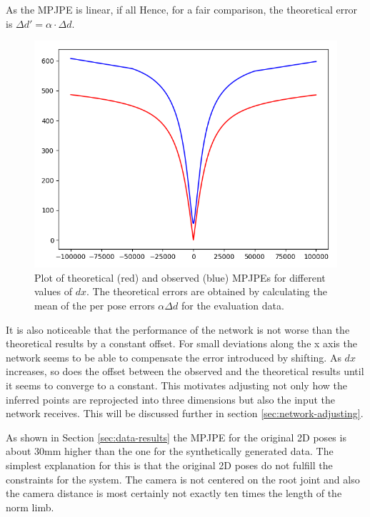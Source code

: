 As the MPJPE is linear, if all 
Hence, for a fair comparison, the theoretical error is $\Delta d' = \alpha \cdot \Delta d$.

\begin{figure}[ht]	
	\centering
	\includegraphics[scale=0.5]{figures/x_shift_error.png}
	\caption{Plot of theoretical (red) and observed (blue) MPJPEs for different values of $dx$. 
		The theoretical errors are obtained by calculating the mean of the per pose errors $\alpha \Delta d$ for the evaluation data.}
	\label{fig:x-shift-error}
\end{figure}

It is also noticeable that the performance of the network is not worse than the theoretical results by a constant offset.
For small deviations along the x axis the network seems to be able to compensate the error introduced by shifting.
As $dx$ increases, so does the offset between the observed and the theoretical results until it seems to converge to a constant.
This motivates adjusting not only how the inferred points are reprojected into three dimensions but also the input the network receives.
This will be discussed further in section \ref{sec:network-adjusting}.

As shown in Section \ref{sec:data-results} the MPJPE for the original 2D poses is about  30mm higher than the one for the synthetically generated data.
The simplest explanation for this is that the original 2D poses do not fulfill the constraints for the system.
The camera is not centered on the root joint and also the camera distance is most certainly not exactly ten times the length of the norm limb.

